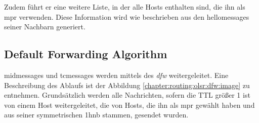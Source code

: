 		
%    
%	
%			
%		
%

Zudem führt er eine weitere Liste, in der alle Hosts enthalten sind, die ihn als \gls{mpr} verwenden. Diese Information wird wie beschrieben aus den \glspl{hellomessage} seiner Nachbarn generiert.

\subsection{Default Forwarding Algorithm}
\label{chapter:routing:olsr:forward}

\glspl{midmessage} und \glspl{tcmessage} werden mittels des \textit{\gls{dfw}} weitergeleitet. Eine Beschreibung des Ablaufs ist der Abbildung \ref{chapter:routing:olsr:dfw:image} zu entnehmen. Grundsätzlich werden alle Nachrichten, sofern die TTL größer 1 ist von einem Host weitergeleitet, die von Hosts, die ihn als \gls{mpr} gewählt haben und aus seiner symmetrischen \gls{1hnb} stammen, gesendet wurden.

